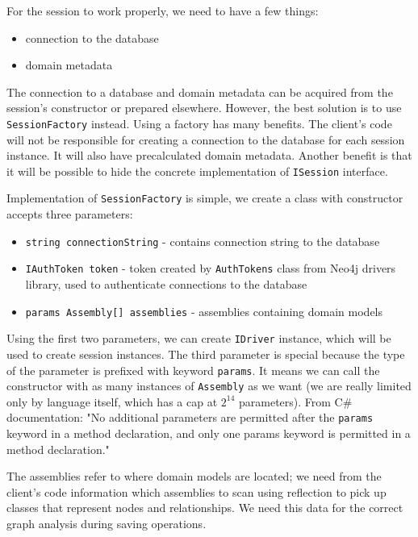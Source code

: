For the session to work properly, we need to have a few things:

\begin{itemize}
    \item connection to the database
    \item domain metadata
\end{itemize}

The connection to a database and domain metadata can be acquired from the session's constructor or prepared elsewhere. However,
the best solution is to use \texttt{SessionFactory} instead. Using a factory has many benefits. The client's code will not be responsible for
creating a connection to the database for each session instance. It will also have precalculated domain metadata. Another benefit is
that it will be possible to hide the concrete implementation of \texttt{ISession} interface.

Implementation of \texttt{SessionFactory} is simple, we create a class with constructor accepts three parameters:
\begin{itemize}
    \item {\texttt{string connectionString} - contains connection string to the database}
    \item {\texttt{IAuthToken token} - token created by \texttt{AuthTokens} class from Neo4j drivers library, used to authenticate connections to the database}
    \item {\texttt{params Assembly[] assemblies} - assemblies containing domain models}
\end{itemize}
Using the first two parameters, we can create \texttt{IDriver} instance, which will be used to create session instances. The third parameter is special
because the type of the parameter is prefixed with keyword \texttt{params}. It means we can call the constructor with as many instances of \texttt{Assembly} as we want
(we are really limited only by language itself, which has a cap at $2^{14}$ parameters). From C\# documentation:
"No additional parameters are permitted after the \texttt{params} keyword in a method declaration, and only one params keyword is permitted in a method declaration." \cite{billwagner_params_nodate}

The assemblies refer to where domain models are located; we need from the client's code information which assemblies to scan using reflection to pick up classes
that represent nodes and relationships. We need this data for the correct graph analysis during saving operations.

